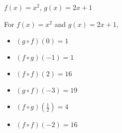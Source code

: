 {$f(x) = x^2$, $g(x) = 2x+1$}
{For  $f(x) = x^2$ and $g(x) = 2x+1$,
\begin{multicols}{2}

\begin{itemize}

\item  $(g\circ f)(0) = 1$

\item  $(f\circ g)(-1) = 1$

\item  $(f \circ f)(2) = 16$

\item  $(g\circ f)(-3) = 19$

\item  $(f\circ g)\left(\frac{1}{2}\right) = 4$

\item  $(f \circ f)(-2) = 16$

\end{itemize}

\end{multicols}}